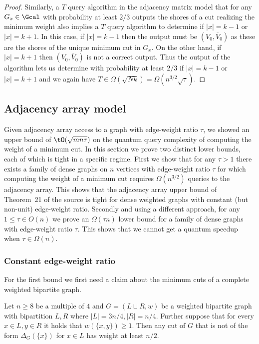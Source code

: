 \begin{proof}
Similarly, a $T$ query algorithm in the adjacency matrix model that for any $G_x \in \Gcal$ with probability at least $2/3$ outputs the shores of a cut realizing the minimum weight 
also implies a $T$ query algorithm to determine if $|x| = k-1$ or $|x| = k+1$.  In this case, if $|x| = k-1$ then the output must be $(V_0, \overline{V}_0)$ as these are the shores of the unique 
minimum cut in $G_x$.  On the other hand, if $|x| = k+1$ then $(V_0, \overline{V}_0)$ is not a correct output.  Thus the output of the algorithm lets us determine with probability at least $2/3$ if 
$|x| = k-1$ or $|x| = k+1$ and we again have $T \in \Omega(\sqrt{N k}) = \Omega(n^{3/2}\sqrt{\tau})$.
\end{proof}

\subsection{Adjacency array model}
Given adjacency array access to a graph with edge-weight ratio $\tau$, we showed an upper bound of $\tO(\sqrt{m n \tau})$ on the quantum query complexity of computing the weight of a minimum cut.
In this section we prove two distinct lower bounds, each of which is tight in a specific regime.
First we show that for any $\tau > 1$ there exists a family of dense graphs on $n$ vertices with edge-weight ratio $\tau$ for which computing the weight of a minimum cut requires $\Omega(n^{3/2})$ queries to the adjacency array.
This shows that the adjacency array upper bound of Theorem~21 of the source is tight for dense weighted graphs with constant (but non-unit) edge-weight ratio.
Secondly and using a different approach, for any $1 \leq \tau \in O(n)$ we prove an $\Omega(\tau n)$ lower bound for a family of dense graphs with edge-weight ratio $\tau$.
This shows that we cannot get a quantum speedup when $\tau \in \Omega(n)$.

\subsubsection{Constant edge-weight ratio}

For the first bound we first need a claim about the minimum cuts of a complete weighted bipartite graph.
\begin{claim}
\label{clm:complete_bipartite}
Let $n \ge 8$ be a multiple of $4$ and $G=(L \sqcup R,w)$ be a weighted bipartite graph with bipartition $L,R$ where $|L| = 3n/4, |R| = n/4$. Further suppose that 
for every $x \in L, y \in R$ it holds that $w(\{x,y\}) \ge 1$.   Then any cut of $G$ that is not of the form $\Delta_G(\{x\})$ for $x \in L$ has weight at least $n/2$.  
\end{claim}

